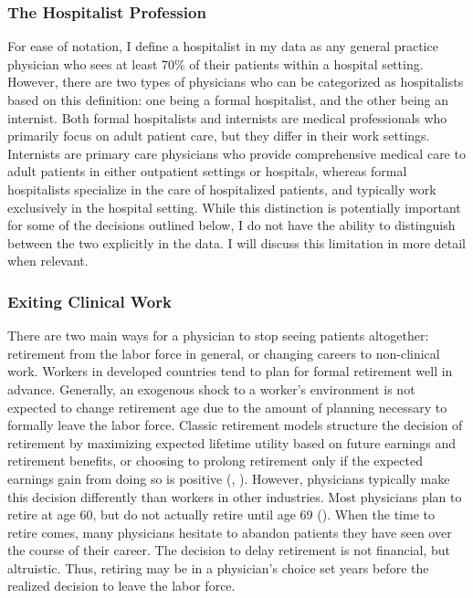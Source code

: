 \documentclass[12pt]{article}
\begin{document}
\subsubsection{The Hospitalist Profession}

For ease of notation, I define a hospitalist in my data as any general practice physician who sees at least 70\% of their patients within a hospital setting. However, there are two types of physicians who can be categorized as hospitalists based on this definition: one being a formal hospitalist, and the other being an internist. Both formal hospitalists and internists are medical professionals who primarily focus on adult patient care, but they differ in their work settings. Internists are primary care physicians who provide comprehensive medical care to adult patients in either outpatient settings or hospitals, whereas formal hospitalists specialize in the care of hospitalized patients, and typically work exclusively in the hospital setting. While this distinction is potentially important for some of the decisions outlined below, I do not have the ability to distinguish between the two explicitly in the data. I will discuss this limitation in more detail when relevant. 

\subsubsection{Exiting Clinical Work}

There are two main ways for a physician to stop seeing patients altogether: retirement from the labor force in general, or changing careers to non-clinical work. Workers in developed countries tend to plan for formal retirement well in advance. Generally, an exogenous shock to a worker's environment is not expected to change retirement age due to the amount of planning necessary to formally leave the labor force. Classic retirement models structure the decision of retirement by maximizing expected lifetime utility based on future earnings and retirement benefits, or choosing to prolong retirement only if the expected earnings gain from doing so is positive (\cite{gustman1986disaggregated}, \cite{stock1990pension}). However, physicians typically make this decision differently than workers in other industries. Most physicians plan to retire at age 60, but do not actually retire until age 69 (\cite{collier2017challenges}). When the time to retire comes, many physicians hesitate to abandon patients they have seen over the course of their career. The decision to delay retirement is not financial, but altruistic. Thus, retiring may be in a physician's choice set years before the realized decision to leave the labor force. 
\end{document}
